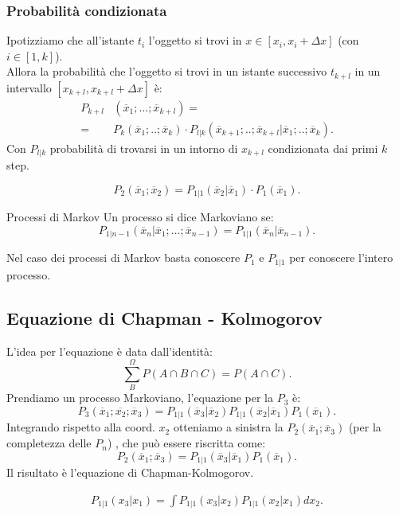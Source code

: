 \subsubsection{Probabilità condizionata}%
\label{subsub:Probabilità condizionata}
Ipotizziamo che all'istante $t_i$ l'oggetto si trovi in $x \in \left[x_i, x_i + \Delta x\right]$ (con $i \in \left[1, k\right]$).\\
Allora la probabilità che l'oggetto si trovi in un istante successivo $t_{k+l}$ in un intervallo $\left[x_{k+l}, x_{k+l} + \Delta x\right]$ è:
\[\begin{aligned}
    P_{k+l}&(\overline{x}_1;\ldots; \overline{x}_{k+l}) =\\
    =&P_k(\overline{x}_1;..;\overline{x}_k)\cdot P_{l|k}(\overline{x}_{k+1};..;\overline{x}_{k+l}|\overline{x}_1;..;\overline{x}_k) 
.\end{aligned}\]
Con $P_{l|k}$ probabilità di trovarsi in un intorno di $x_{k+l}$ condizionata dai primi $k$ step. 
\begin{exmp}
    \[
	P_2(\overline{x}_1;\overline{x}_2) = P_{1|1}(\overline{x}_2|\overline{x}_1) \cdot P_1(\overline{x}_1) 
    .\] 
\end{exmp}
\noindent

\begin{greenbox}{Processi di Markov}
    Un processo si dice Markoviano se:
    \[
	P_{1|n-1}(\overline{x}_n|\overline{x}_1;\ldots;\overline{x}_{n-1})  = P_{1|1}(\overline{x}_n|\overline{x}_{n-1}) 
    .\] 
\end{greenbox}
\noindent
Nel caso dei processi di Markov basta conoscere $P_1$ e $P_{1|1}$ per conoscere l'intero processo.


\subsection{Equazione di Chapman - Kolmogorov}%
\label{sub:Equazione di Chapman-Kolmogorov}

L'idea per l'equazione è data dall'identità:
\[
    \sum_{B}^{\Omega} P(A \cap B \cap C) = P(A \cap C) 
.\] 
Prendiamo un processo Markoviano, l'equazione per la $P_3$ è:
\[
    P_3(\overline{x}_1; \overline{x_2}; \overline{x}_3) = P_{1|1}(\overline{x}_3| \overline{x}_2) P_{1|1}(\overline{x}_2 | \overline{x}_1) 
    P_1(\overline{x}_1) 
.\] 
Integrando rispetto alla coord. $x_2$ otteniamo a sinistra la $P_2(\overline{x}_1;\overline{x}_3)$ (per la completezza delle $P_n$) , che può essere riscritta come:
\[
    P_2(\overline{x}_1;\overline{x}_3) = P_{1|1}(\overline{x}_3|\overline{x}_1) P_1(\overline{x}_1)
.\] 
Il risultato è l'equazione di Chapman-Kolmogorov.
\begin{redbox}{}
    \[\begin{aligned}
	P_{1|1}(x_3|x_1) = \int P_{1|1}(x_3|x_2) P_{1|1}(x_2|x_1)dx_2 \label{eq:3_CK}
    .\end{aligned}\]
\end{redbox}
\noindent
\clearpage
